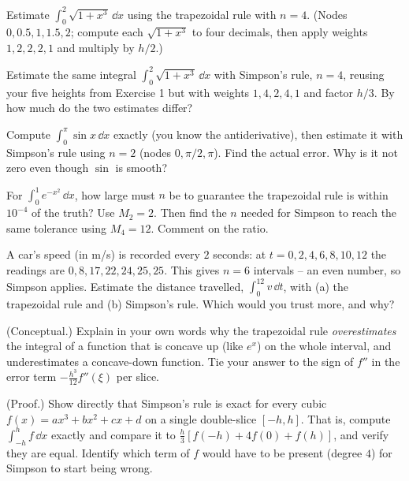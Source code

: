 \begin{exercise}
Estimate $\int_0^2 \sqrt{1 + x^3}\,\dd x$ using the trapezoidal rule with $n = 4$. (Nodes $0, 0.5, 1, 1.5, 2$; compute each $\sqrt{1+x^3}$ to four decimals, then apply weights $1,2,2,2,1$ and multiply by $h/2$.)
\end{exercise}

\begin{exercise}
Estimate the same integral $\int_0^2 \sqrt{1+x^3}\,\dd x$ with Simpson's rule, $n = 4$, reusing your five heights from Exercise 1 but with weights $1,4,2,4,1$ and factor $h/3$. By how much do the two estimates differ?
\end{exercise}

\begin{exercise}
Compute $\int_0^{\pi} \sin x\,\dd x$ exactly (you know the antiderivative), then estimate it with Simpson's rule using $n = 2$ (nodes $0, \pi/2, \pi$). Find the actual error. Why is it not zero even though $\sin$ is smooth?
\end{exercise}

\begin{exercise}
For $\int_0^1 e^{-x^2}\,\dd x$, how large must $n$ be to guarantee the trapezoidal rule is within $10^{-4}$ of the truth? Use $M_2 = 2$. Then find the $n$ needed for Simpson to reach the same tolerance using $M_4 = 12$. Comment on the ratio.
\end{exercise}

\begin{exercise}
A car's speed (in m/s) is recorded every $2$ seconds: at $t = 0,2,4,6,8,10,12$ the readings are $0, 8, 17, 22, 24, 25, 25$. This gives $n = 6$ intervals -- an even number, so Simpson applies. Estimate the distance travelled, $\int_0^{12} v\,\dd t$, with (a) the trapezoidal rule and (b) Simpson's rule. Which would you trust more, and why?
\end{exercise}

\begin{exercise}
(Conceptual.) Explain in your own words why the trapezoidal rule \emph{overestimates} the integral of a function that is concave up (like $e^x$) on the whole interval, and underestimates a concave-down function. Tie your answer to the sign of $f''$ in the error term $-\tfrac{h^3}{12}f''(\xi)$ per slice.
\end{exercise}

\begin{exercise}
(Proof.) Show directly that Simpson's rule is exact for every cubic $f(x) = ax^3 + bx^2 + cx + d$ on a single double-slice $[-h, h]$. That is, compute $\int_{-h}^{h} f\,\dd x$ exactly and compare it to $\tfrac{h}{3}[f(-h) + 4f(0) + f(h)]$, and verify they are equal. Identify which term of $f$ would have to be present (degree $4$) for Simpson to start being wrong.
\end{exercise}

